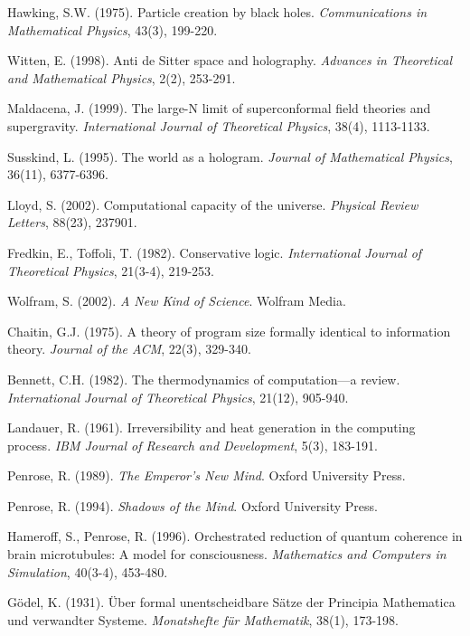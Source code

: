 \documentclass[12pt]{article}
\theoremstyle{plain}
\theoremstyle{definition}
\begin{document}
\begin{thebibliography}{99}
 Hawking, S.W. (1975). Particle creation by black holes. \emph{Communications in Mathematical Physics}, 43(3), 199-220.

 Witten, E. (1998). Anti de Sitter space and holography. \emph{Advances in Theoretical and Mathematical Physics}, 2(2), 253-291.

 Maldacena, J. (1999). The large-N limit of superconformal field theories and supergravity. \emph{International Journal of Theoretical Physics}, 38(4), 1113-1133.

 Susskind, L. (1995). The world as a hologram. \emph{Journal of Mathematical Physics}, 36(11), 6377-6396.

 Lloyd, S. (2002). Computational capacity of the universe. \emph{Physical Review Letters}, 88(23), 237901.

 Fredkin, E., Toffoli, T. (1982). Conservative logic. \emph{International Journal of Theoretical Physics}, 21(3-4), 219-253.

 Wolfram, S. (2002). \emph{A New Kind of Science}. Wolfram Media.

 Chaitin, G.J. (1975). A theory of program size formally identical to information theory. \emph{Journal of the ACM}, 22(3), 329-340.

 Bennett, C.H. (1982). The thermodynamics of computation—a review. \emph{International Journal of Theoretical Physics}, 21(12), 905-940.

 Landauer, R. (1961). Irreversibility and heat generation in the computing process. \emph{IBM Journal of Research and Development}, 5(3), 183-191.

 Penrose, R. (1989). \emph{The Emperor's New Mind}. Oxford University Press.

 Penrose, R. (1994). \emph{Shadows of the Mind}. Oxford University Press.

 Hameroff, S., Penrose, R. (1996). Orchestrated reduction of quantum coherence in brain microtubules: A model for consciousness. \emph{Mathematics and Computers in Simulation}, 40(3-4), 453-480.

 Gödel, K. (1931). Über formal unentscheidbare Sätze der Principia Mathematica und verwandter Systeme. \emph{Monatshefte für Mathematik}, 38(1), 173-198.


\end{thebibliography}
\end{document}

